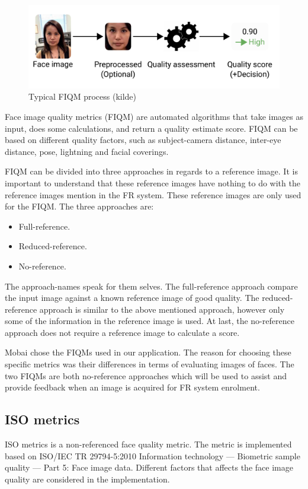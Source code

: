 \begin{figure}[h]
    \centering
    \includegraphics[scale = 0.45]{figures/FIQM.png}
    \caption{Typical FIQM process (kilde)}
    \label{fig:fiqm}
\end{figure}

Face image quality metrics (FIQM) are automated algorithms that take images as input, does some calculations, and return a quality estimate score. FIQM can be based on different quality factors, such as subject-camera distance, inter-eye distance, pose, lightning and facial coverings. 

FIQM can be divided into three approaches in regards to a reference image. It is important to understand that these reference images have nothing to do with the reference images mention in the FR system. These reference images are only used for the FIQM. The three approaches are: 

\begin{itemize}
    \item Full-reference.
    \item Reduced-reference.
    \item No-reference. 
\end{itemize}

The approach-names speak for them selves. The full-reference approach compare the input image against a known reference image of good quality. The reduced-reference approach is similar to the above mentioned approach, however only some of the information in the reference image is used. At last, the no-reference approach does not require a reference image to calculate a score. 

Mobai chose the FIQMs used in our application. The reason for choosing these specific metrics was their differences in terms of evaluating images of faces. The two FIQMs are both no-reference approaches which will be used to assist and provide feedback when an image is acquired for FR system enrolment. 


\subsection{ISO metrics}
ISO metrics is a non-referenced face quality metric. The metric is implemented based on ISO/IEC TR 29794-5:2010 Information technology — Biometric sample quality — Part 5: Face image data. Different factors that affects the face image quality are considered in the implementation. 

